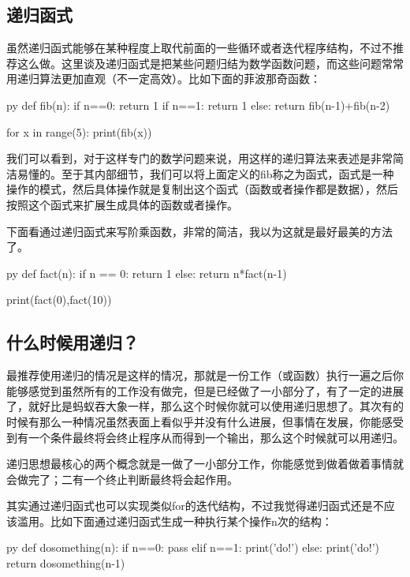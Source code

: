 \documentclass[12pt,oneside]{book}
\begin{document}
\begin{common-format}
\section{递归函式}
\label{sec:递归函式}
虽然递归函式能够在某种程度上取代前面的一些循环或者迭代程序结构，不过不推荐这么做。这里谈及递归函式是把某些问题归结为数学函数问题，而这些问题常常用递归算法更加直观（不一定高效）。比如下面的菲波那奇函数：
\begin{xverbatim}[129]{py}
def fib(n):
    if n==0:
        return 1
    if n==1:
        return 1
    else:
        return fib(n-1)+fib(n-2)
        
for x in range(5):
    print(fib(x))
\end{xverbatim}
我们可以看到，对于这样专门的数学问题来说，用这样的递归算法来表述是非常简洁易懂的。至于其内部细节，我们可以将上面定义的fib称之为函式，函式是一种操作的模式，然后具体操作就是复制出这个函式（函数或者操作都是数据），然后按照这个函式来扩展生成具体的函数或者操作。

下面看通过递归函式来写阶乘函数，非常的简洁，我以为这就是最好最美的方法了。
\begin{xverbatim}[129]{py}
def fact(n):
    if n == 0:
        return 1
    else:
        return n*fact(n-1)
        
print(fact(0),fact(10))
\end{xverbatim}

\subsection{什么时候用递归？}
最推荐使用递归的情况是这样的情况，那就是一份工作（或函数）执行一遍之后你能够感觉到虽然所有的工作没有做完，但是已经做了一小部分了，有了一定的进展了，就好比是蚂蚁吞大象一样，那么这个时候你就可以使用递归思想了。其次有的时候有那么一种情况虽然表面上看似乎并没有什么进展，但事情在发展，你能感受到有一个条件最终将会终止程序从而得到一个输出，那么这个时候就可以用递归。

递归思想最核心的两个概念就是一做了一小部分工作，你能感觉到做着做着事情就会做完了；二有一个终止判断最终将会起作用。

其实通过递归函式也可以实现类似for的迭代结构，不过我觉得递归函式还是不应该滥用。比如下面通过递归函式生成一种执行某个操作n次的结构：

\begin{xverbatim}[129]{py}
def dosomething(n):
    if n==0:
        pass
    elif n==1:
        print('do!')
    else:
        print('do!')
        return dosomething(n-1)


\end{xverbatim}
\end{common-format}
\end{document}

